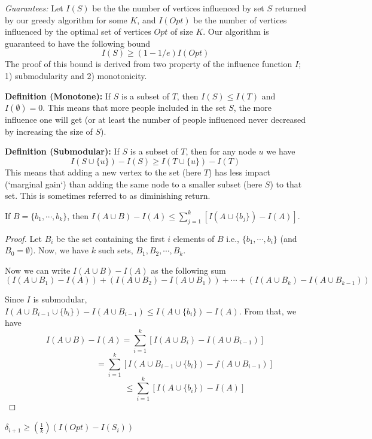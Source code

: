 \textit{Guarantees:} Let $I(S)$ be the the number of vertices influenced by set $S$ returned by our greedy algorithm for some $K$, and $I(Opt)$ be the number of vertices influenced by the optimal set of vertices $Opt$ of size $K$. Our algorithm is guaranteed to have the following bound
$$
I(S) \geq (1 - 1/e)I(Opt)
$$
The proof of this bound is derived from two property of the influence function $I$; 1) submodularity and 2) monotonicity.

\noindent
\textbf{Definition (Monotone):} If $S$ is a subset of $T$, then $I(S)\leq I(T)$ and $I(\emptyset)=0$. This means that more people included in the set $S$, the more influence one will get (or at least the number of people influenced never decreased by increasing the size of $S$). 

\noindent
\textbf{Definition (Submodular):} If $S$ is a subset of $T$, then for any node $u$ we have 
$$
I(S\cup \{u\}) - I(S) \geq I(T\cup\{u\})-I(T)
$$
This means that adding a new vertex to the set (here $T$) has less impact (`marginal gain`) than adding the same node to a smaller subset (here $S$) to that set. This is sometimes referred to as diminishing return.

\noindent
\begin{lemma}
If $B=\{b_{1},\cdots, b_{k}\}$, then $I(A\cup B)-I(A)\leq \sum_{j=1}^{k} [I(A\cup\{b_{j}\})-I(A)] $.
\end{lemma}

\begin{proof}
Let $B_{i}$ be the set containing the first $i$ elements of $B$ i.e., $\{b_{1},\cdots,b_{i}\}$ (and $B_{0}=\emptyset$). Now, we have $k$ such sets, $B_{1},B_{2},\cdots, B_{k}$.

\noindent
Now we can write $I(A\cup B)-I(A)$ as the following sum 
$$
\left( I(A\cup B_{1}) - I(A)\right) + \left( I(A\cup B_{2}) - I(A\cup B_{1})\right)+\cdots+\left( I(A\cup B_{k}) - I(A\cup B_{k-1})\right)
$$

\noindent
Since $I$ is submodular, $I(A\cup B_{i-1}\cup \{b_{i}\}) - I(A\cup B_{i-1})\leq I(A\cup \{b_{i}\})-I(A)$. From that, we have 
\mathleft
\[
I(A\cup B) - I(A) = \sum_{i=1}^{k}[I(A\cup B_{i})-I(A\cup B_{i-1})] 
\]
\[
\qquad\qquad\qquad\quad= \sum_{i=1}^{k}[I(A\cup B_{i-1}\cup\{b_{i}\}) -f(A\cup B_{i-1})]
\]
\[
\qquad\qquad\qquad\quad\leq \sum_{i=1}^{k}[I(A\cup \{b_{i}\})-I(A)]
\]
\end{proof}

\begin{lemma}
$\delta_{i+1} \geq (\frac{1}{k})(I(Opt)-I(S_{i}))$
\end{lemma}

